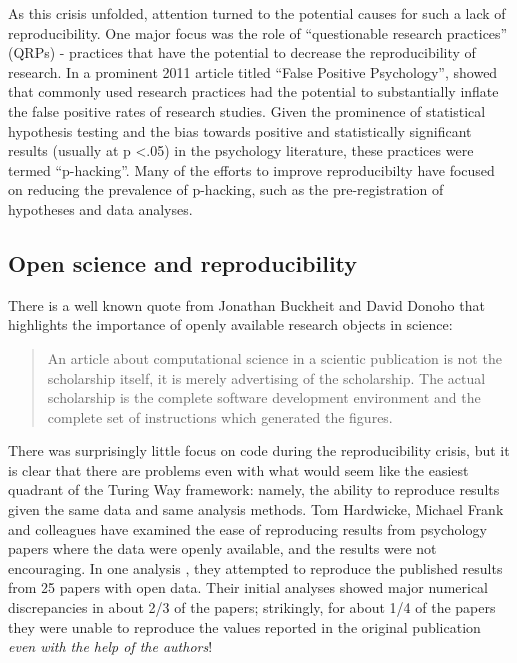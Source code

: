 As this crisis unfolded, attention turned to the potential causes for such a lack of reproducibility.
One major focus was the role of ``questionable research practices'' (QRPs) - practices that have the potential to decrease the reproducibility of research.
In a prominent 2011 article titled ``False Positive Psychology'', \citep{Simmons:2011aa} showed that commonly used research practices had the potential to substantially inflate the false positive rates of research studies.
Given the prominence of statistical hypothesis testing and the bias towards positive and statistically significant results (usually at p \textless  .05) in the psychology literature, these practices were termed ``p-hacking''.
Many of the efforts to improve reproducibilty have focused on reducing the prevalence of p-hacking, such as the pre-registration of hypotheses and data analyses.

\subsection{Open science and reproducibility}

There is a well known quote from Jonathan Buckheit and David Donoho \citep{Buckheit:1995aa} that highlights the importance of openly available research objects in science:

\begin{quote}
An article about computational science in a scientic publication is not the scholarship itself, it is merely advertising of the scholarship. The actual scholarship is the complete software development environment and the complete set of instructions which generated the figures.
\end{quote}

There was surprisingly little focus on code during the reproducibility crisis, but it is clear that there are problems even with what would seem like the easiest quadrant of the Turing Way framework: namely, the ability to reproduce results given the same data and same analysis methods.
Tom Hardwicke, Michael Frank and colleagues have examined the ease of reproducing results from psychology papers where the data were openly available, and the results were not encouraging.
In one analysis \citep{Hardwicke:2021aa}, they attempted to reproduce the published results from 25 papers with open data.
Their initial analyses showed major numerical discrepancies in about 2/3 of the papers; strikingly, for about 1/4 of the papers they were unable to reproduce the values reported in the original publication \textit{even with the help of the authors}!

